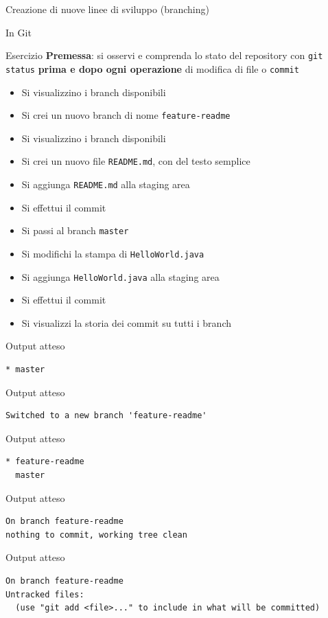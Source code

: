 \documentclass[presentation]{beamer}
\begin{document}
\begin{frame}{Creazione di nuove linee di sviluppo (branching)}
\begin{block}{In Git}
\begin{itemize}
		\end{itemize}
	\end{block}
	\begin{block}{Esercizio}	
		\textbf{Premessa}: si osservi e comprenda lo stato del repository con \texttt{git status} \textbf{prima e dopo ogni operazione} di modifica di file o \texttt{commit}
		\begin{itemize}
			\footnotesize
			\item Si visualizzino i branch disponibili
			\item Si crei un nuovo branch di nome \texttt{feature-readme}
			\item Si visualizzino i branch disponibili
			\item Si crei un nuovo file \texttt{README.md}, con del testo semplice
			\item Si aggiunga \texttt{README.md} alla staging area
			\item Si effettui il commit
			\item Si passi al branch \texttt{master}
			\item Si modifichi la stampa di \texttt{HelloWorld.java}
			\item Si aggiunga \texttt{HelloWorld.java} alla staging area
			\item Si effettui il commit
			\item Si visualizzi la storia dei commit su tutti i branch
		\end{itemize}
	\end{block}
	\begin{block}{Output atteso}
		\begin{Verbatim}[fontsize=\scriptsize]
* master
		\end{Verbatim}
	\end{block}
	\begin{block}{Output atteso}
		\begin{Verbatim}[fontsize=\scriptsize]
Switched to a new branch 'feature-readme'
		\end{Verbatim}
	\end{block}
	\begin{block}{Output atteso}
		\begin{Verbatim}[fontsize=\scriptsize]
* feature-readme
  master
		\end{Verbatim}
	\end{block}
	\begin{block}{Output atteso}
		\begin{Verbatim}[fontsize=\scriptsize]
On branch feature-readme
nothing to commit, working tree clean
		\end{Verbatim}
	\end{block}
	\begin{block}{Output atteso}
		\begin{Verbatim}[fontsize=\scriptsize]
On branch feature-readme
Untracked files:
  (use "git add <file>..." to include in what will be committed)


\end{Verbatim}
\end{block}
\end{frame}
\end{document}
